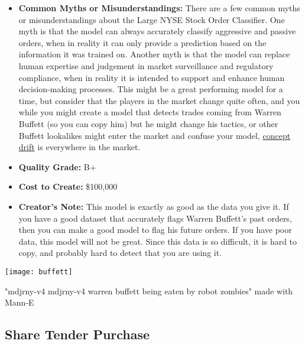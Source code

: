 \begin{itemize}
    \item \textbf{Common Myths or Misunderstandings:} There are a few common myths or misunderstandings about the Large NYSE Stock Order Classifier. One myth is that the model can always accurately classify aggressive and passive orders, when in reality it can only provide a prediction based on the information it was trained on. Another myth is that the model can replace human expertise and judgement in market surveillance and regulatory compliance, when in reality it is intended to support and enhance human decision-making processes. This might be a great performing model for a time, but consider that the players in the market change quite often, and you while you might create a model that detects trades coming from Warren Buffett (so you can copy him) but he might change his tactics, or other Buffett lookalikes might enter the market and confuse your model, \hyperref[sec:drift]{concept drift} is everywhere in the market.
    \item \textbf{Quality Grade:} B+
    \item \textbf{Cost to Create:} \$100,000
    \item \textbf{Creator's Note:} This model is exactly as good as the data you give it. If you have a good dataset that accurately flags Warren Buffett’s past orders, then you can make a good model to flag his future orders. If you have poor data, this model will not be great. Since this data is so difficult, it is hard to copy, and probably hard to detect that you are using it.
\end{itemize}

\begin{pdf}
\begin{marginfigure}[-5.5cm]
        \texttt{[image: buffett]}
        \caption{"mdjrny-v4 mdjrny-v4 warren buffett being eaten by robot zombies" made with Mann-E}
\end{marginfigure}
\end{pdf}

\subsection{Share Tender Purchase}

